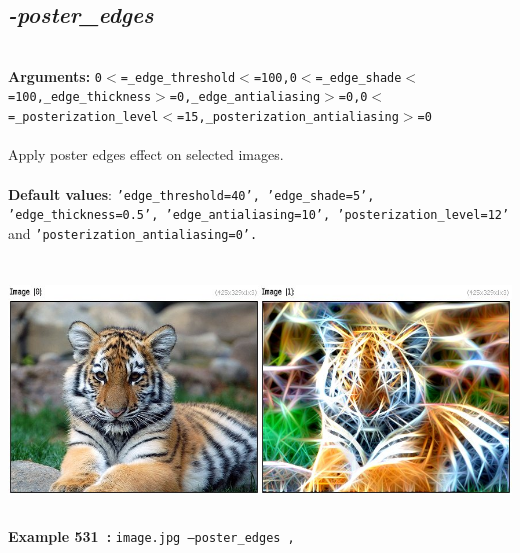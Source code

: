 \documentclass[a4paper,11pt,twoside]{book}
\begin{document}
\subsection{\emph{-poster\_edges} }\vspace*{-0.5em}
~\\\textbf{Arguments: } 
{\small \texttt{0$<$=\_edge\_threshold$<$=100,0$<$=\_edge\_shade$<$=100,\_edge\_thickness$>$=0,\_edge\_antialiasing$>$=0,0$<$=\_posterization\_level$<$=15,\_posterization\_antialiasing$>$=0}}\\~\\
Apply poster edges effect on selected images.
~\\~\\\textbf{Default values}: {\small \texttt{'edge\_threshold=40', 'edge\_shade=5', 'edge\_thickness=0.5', 'edge\_antialiasing=10', 'posterization\_level=12'} and \texttt{'posterization\_antialiasing=0'.}}
\begin{center}\includegraphics[keepaspectratio=true,height=7cm,width=\textwidth]{img/gmic_def531.jpg}\\
{\footnotesize \textbf{Example 531~:} \texttt{image.jpg --poster\_edges ,}}
\end{center}
\end{document}

